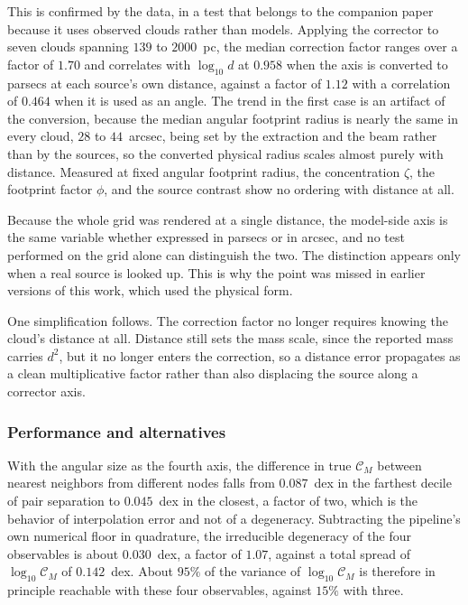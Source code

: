 \documentclass{aa}
\newcommand{\CM}{\mathcal{C}_{M}}
\begin{document}
This is confirmed by the data, in a test that belongs to the companion
paper because it uses observed clouds rather than models. Applying the
corrector to seven clouds spanning $139$ to $2000$~pc, the median correction
factor ranges over a factor of $1.70$ and correlates with $\log_{10}d$ at
$0.958$ when the axis is converted to parsecs at each source's own distance,
against a factor of $1.12$ with a correlation of $0.464$ when it is used as
an angle. The trend in the first case is an artifact of the conversion,
because the median angular footprint radius is nearly the same in every
cloud, $28$ to $44$~arcsec, being set by the extraction and the beam rather
than by the sources, so the converted physical radius scales almost purely
with distance. Measured at fixed angular footprint radius, the concentration
$\zeta$, the footprint factor $\phi$, and the source contrast show no
ordering with distance at all.

Because the whole grid was rendered at a single distance, the model-side
axis is the same variable whether expressed in parsecs or in arcsec, and no
test performed on the grid alone can distinguish the two. The distinction
appears only when a real source is looked up. This is why the point was
missed in earlier versions of this work, which used the physical form.

One simplification follows. The correction factor no longer requires knowing
the cloud's distance at all. Distance still sets the mass scale, since the
reported mass carries $d^{2}$, but it no longer enters the correction, so a
distance error propagates as a clean multiplicative factor rather than also
displacing the source along a corrector axis.

\subsubsection{Performance and alternatives}

With the angular size as the fourth axis, the difference in true $\CM$
between nearest neighbors from different nodes falls from $0.087$~dex in the
farthest decile of pair separation to $0.045$~dex in the closest, a factor
of two, which is the behavior of interpolation error and not of a
degeneracy. Subtracting the pipeline's own numerical floor in quadrature,
the irreducible degeneracy of the four observables is about $0.030$~dex, a
factor of $1.07$, against a total spread of $\log_{10}\CM$ of $0.142$~dex.
About $95\%$ of the variance of $\log_{10}\CM$ is therefore in principle
reachable with these four observables, against $15\%$ with three.
\end{document}
